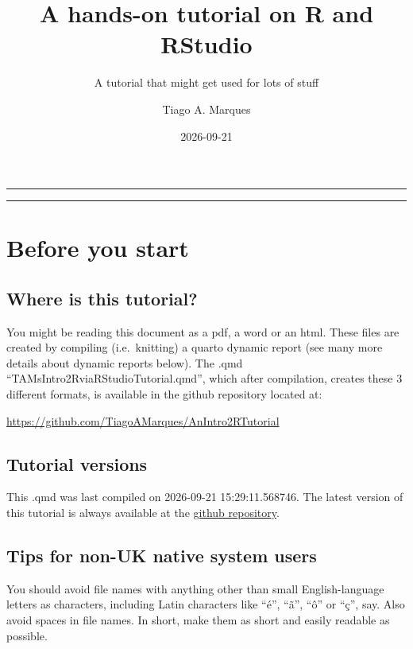 \documentclass[
  letterpaper,
  DIV=11,
  numbers=noendperiod]{scrartcl}
\title{A hands-on tutorial on R and RStudio}
\subtitle{A tutorial that might get used for lots of stuff}
\author{Tiago A. Marques}
\date{2026-09-21}
\begin{document}
\maketitle


\begin{center}\rule{0.5\linewidth}{0.5pt}\end{center}

\begin{center}\rule{0.5\linewidth}{0.5pt}\end{center}

\newpage

\section{Before you start}\label{before-you-start}

\subsection{Where is this tutorial?}\label{where-is-this-tutorial}

You might be reading this document as a pdf, a word or an html. These
files are created by compiling (i.e.~knitting) a quarto dynamic report
(see many more details about dynamic reports below). The .qmd
``TAMsIntro2RviaRStudioTutorial.qmd'', which after compilation, creates
these 3 different formats, is available in the github repository located
at:

\url{https://github.com/TiagoAMarques/AnIntro2RTutorial}

\subsection{Tutorial versions}\label{tutorial-versions}

This .qmd was last compiled on 2026-09-21 15:29:11.568746. The latest
version of this tutorial is always available at the
\href{https://github.com/TiagoAMarques/AnIntro2RTutorial}{github
repository}.

\subsection{Tips for non-UK native system
users}\label{tips-for-non-uk-native-system-users}

You should avoid file names with anything other than small
English-language letters as characters, including Latin characters like
``é'', ``ã'', ``ô'' or ``ç'', say. Also avoid spaces in file names. In
short, make them as short and easily readable as possible.
\end{document}
